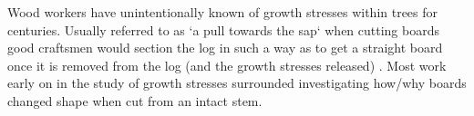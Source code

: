 Wood workers have unintentionally known of growth stresses within trees
for centuries. Usually referred to as `a pull towards the sap` when cutting boards good
craftsmen would section the log in such a way as to get a straight board once it
is removed from the log (and the growth stresses released) \citep{jacobs1945l}. Most work early on in
the study of growth stresses surrounded investigating how/why boards changed
shape when cut from an intact stem.